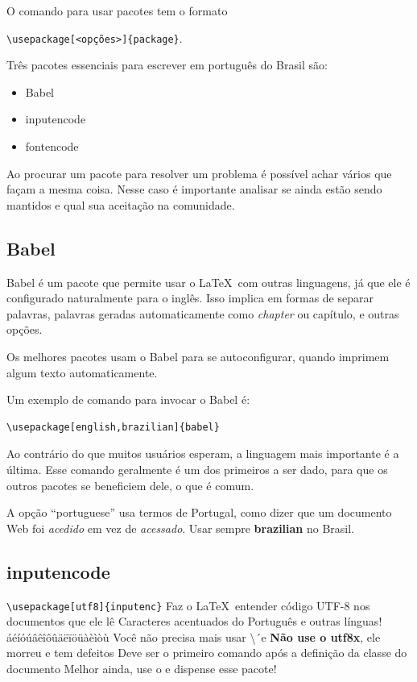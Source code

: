 O comando para usar pacotes tem o formato

\lstinline|\usepackage[<opções>]{package}|.

Três pacotes essenciais para escrever em português do Brasil são:
\begin{itemize}
    \item Babel
    \item inputencode
    \item fontencode
\end{itemize}

Ao procurar um pacote para resolver um problema é possível achar vários que façam a mesma coisa. Nesse caso é importante analisar se ainda estão sendo mantidos e qual sua aceitação na comunidade.

\subsection{Babel}

Babel\parencite{Braams:2020a} é um pacote que permite usar o \LaTeX\ com outras linguagens, já que ele é configurado naturalmente para o inglês. Isso implica em formas de separar palavras, palavras geradas automaticamente como \textit{chapter} ou capítulo, e outras opções. 

Os melhores pacotes usam o Babel para se autoconfigurar, quando imprimem algum texto automaticamente.

Um exemplo de comando para invocar o Babel é:
\begin{verbatim}
\usepackage[english,brazilian]{babel} 
\end{verbatim} 
Ao contrário do que muitos usuários esperam, a linguagem mais importante é a última. Esse comando geralmente é um dos primeiros a ser dado, para que os outros pacotes se beneficiem dele, o que é comum.
   
A opção ``portuguese'' usa termos de Portugal, como dizer que um documento Web foi \textit{acedido} em vez de \textit{acessado}. Usar sempre \textbf{brazilian} no Brasil. 


\subsection{inputencode}
    \begin{outline}
        \1 \lstinline|\usepackage[utf8]{inputenc}|
        \1 Faz o \LaTeX\ entender código UTF-8 nos documentos que ele lê\parencite{Jeffrey:2013}
        \2 Caracteres acentuados do Português e outras línguas!
        \3 áéíóúâêîôûäëïöüàèìòù
        \1 Você não precisa mais usar \textbackslash´e
        \1 \textbf{Não use o utf8x}, ele morreu e tem defeitos
        \1 Deve ser o primeiro comando após a definição da classe do documento
        \1 Melhor ainda, use o  e dispense esse pacote!
    \end{outline}

